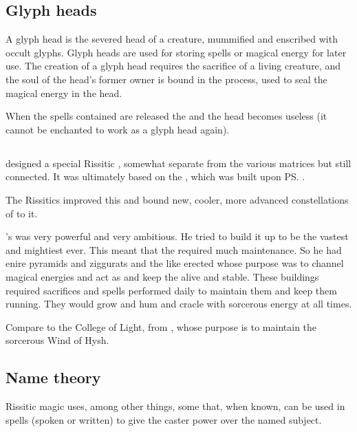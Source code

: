 \subsection{Glyph heads}
A glyph head is the severed head of a creature, mummified and enscribed with occult glyphs. Glyph heads are used for storing spells or magical energy for later use. The creation of a glyph head requires the sacrifice of a living creature, and the soul of the head's former owner is bound in the process, used to seal the magical energy in the head. 

When the spells contained are released the  and the head becomes useless (it cannot be enchanted to work as a glyph head again). 









\subsection{\Matrix}
\Secherdamon{} designed a special Rissitic \matrix, somewhat separate from the various \draconic{} matrices but still connected. 
It was ultimately based on the , which was built upon \ps{} . 

The Rissitics improved this \matrix{} and bound new, cooler, more advanced constellations of \daemons{} to it. 

\Secherdamon's \matrix was very powerful and very ambitious.
He tried to build it up to be the vastest and mightiest \matrix ever.
This meant that the \matrix required much maintenance.
So he had enire pyramids and ziggurats and the like erected whose purpose was to channel magical energies and act as \nexi and keep the \matrix alive and stable.
These buildings required sacrifices and spells performed daily to maintain them and keep them running.
They would grow and hum and cracle with sorcerous energy at all times.

Compare to the College of Light, from \cite{RPG:Warhammer:TheEmpire}, whose purpose is to maintain the sorcerous Wind of Hysh.










\subsection{Name theory}
Rissitic magic uses, among other things, some  that, when known, can be used in spells (spoken or written) to give the caster power over the named subject. 

